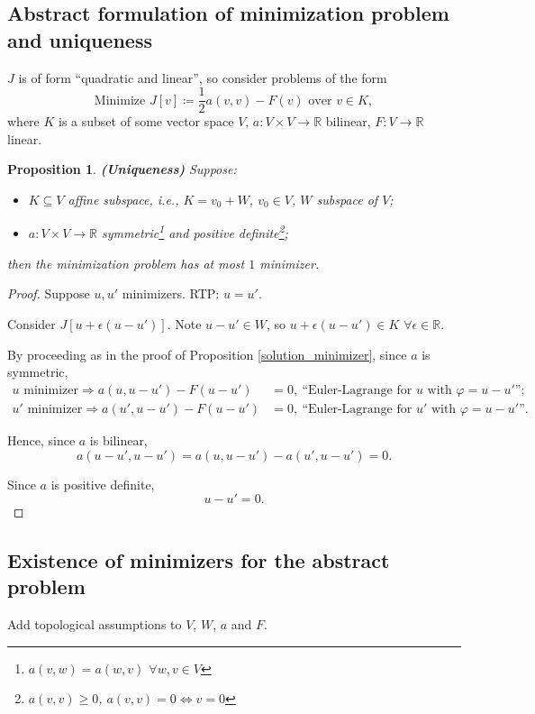\documentclass[12pt]{article}
\newtheorem{proposition}{Proposition}[section]
\theoremstyle{definition}
\begin{document}
\subsection{Abstract formulation of minimization problem and uniqueness}
$J$ is of form ``quadratic and linear'', so consider problems of the form
\[\text{Minimize }J[v]\coloneqq\frac12a(v,v)-F(v)\text{ over }v\in K,\]
where $K$ is a subset of some vector space $V$, $a:V\times V\rightarrow\mathbb R$ bilinear, $F:V\rightarrow\mathbb R$ linear.

\begin{proposition}\label{uniqueness_minimizer}
\emph{\textbf{(Uniqueness)}} Suppose:
\begin{itemize}
\item $K\subseteq V$ affine subspace, i.e., $K=v_0+W$, $v_0\in V$, $W$ subspace of $V$;
\item $a:V\times V\rightarrow\mathbb R$ symmetric\footnote{$a(v,w)=a(w,v)$ $\forall w,v\in V$} and positive definite\footnote{$a(v,v)\geq0$, $a(v,v)=0\Leftrightarrow v=0$};
\end{itemize}
then the minimization problem has at most $1$ minimizer.
\end{proposition}

\begin{proof}
Suppose $u,u'$ minimizers. RTP: $u=u'$.

Consider $J[u+\epsilon(u-u')]$. Note $u-u'\in W$, so $u+\epsilon(u-u')\in K$ $\forall\epsilon\in\mathbb R$.

By proceeding as in the proof of Proposition \ref{solution_minimizer}, since $a$ is symmetric,
\begin{align*}
u\text{ minimizer}\Longrightarrow a(u,u-u')-F(u-u')&=0,\ \text{``Euler-Lagrange for }u\text{ with }\varphi=u-u'\text{''};\\
u'\text{ minimizer}\Longrightarrow a(u',u-u')-F(u-u')&=0,\ \text{``Euler-Lagrange for }u'\text{ with }\varphi=u-u'\text{''}.
\end{align*}

Hence, since $a$ is bilinear,
\[a(u-u',u-u')=a(u,u-u')-a(u',u-u')=0.\]

Since $a$ is positive definite,
\[u-u'=0.\]
\end{proof}

\subsection{Existence of minimizers for the abstract problem}
Add topological assumptions to $V$, $W$, $a$ and $F$.
\end{document}
